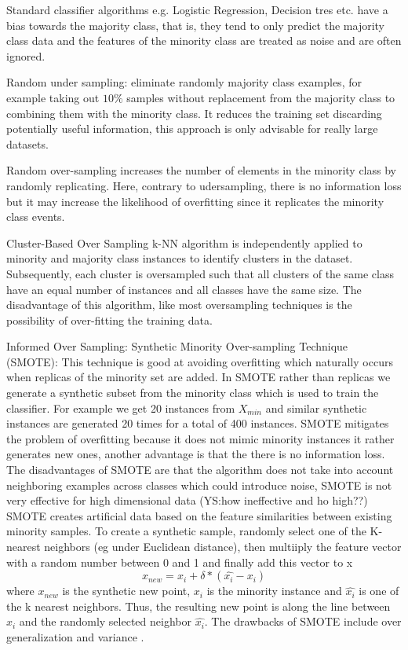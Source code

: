 \documentclass[12pt]{report}
\begin{document}
Standard classifier algorithms e.g. Logistic Regression, Decision tres etc. have a bias towards the majority class, that is, they tend to only predict the majority class data and the features of the minority class are treated as noise and are often ignored. 


Random under sampling: eliminate randomly majority class examples, for example taking out $10\%$ samples without replacement from the majority class to combining them with the minority class. It reduces the training set discarding potentially useful information, this approach is only advisable for really large datasets.

Random over-sampling increases the number of elements in the minority class by randomly replicating. Here, contrary to udersampling, there is no information loss but it may increase the likelihood of overfitting since it replicates the minority class events.

Cluster-Based Over Sampling k-NN algorithm is independently applied to minority and majority class instances to identify clusters in the dataset. Subsequently, each cluster is oversampled such that all clusters of the same class have an equal number of instances and all classes have the same size. The disadvantage of this algorithm, like most oversampling techniques is the possibility of over-fitting the training data.  

Informed Over Sampling: Synthetic Minority Over-sampling Technique (SMOTE): This technique is good at avoiding overfitting which naturally occurs when replicas of the minority set are added. In SMOTE rather than replicas we generate a synthetic subset from the minority class which is used to train the classifier. For example we get 20 instances from $X_{min}$ and similar synthetic instances are generated 20 times for a total of 400 instances. SMOTE mitigates the problem of overfitting because it does not mimic minority instances it rather generates new ones, another advantage is that the there is no information loss.
The disadvantages of SMOTE are that the algorithm does not take into account neighboring examples across classes which could introduce noise, SMOTE is not very effective for high dimensional data (YS:how ineffective and ho high??)
SMOTE creates artificial data based on the feature similarities between existing minority samples. To create a synthetic sample, randomly select one of the K-nearest neighbors (eg under Euclidean distance), then multiiply the feature vector with a random number between 0 and 1 and finally add this vector to x
\begin{equation}
x_{new} =  x_i + \delta * (\hat{x_i} - x_i)
\end{equation}
where $x_{new}$ is the synthetic new point, $x_i$ is the minority instance and $\hat{x_i}$ is one of the k nearest neighbors. Thus, the resulting new point is along the line between $x_i$ and the randomly selected neighbor $\hat{x_i}$. The drawbacks of SMOTE include over generalization and variance \cite{wang2004imbalanced}.
\end{document}
